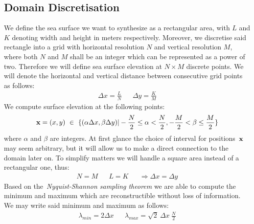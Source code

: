 \subsection{Domain Discretisation}
\label{sec:domain_discretisation}
%
We define the sea surface we want to synthesize as a rectangular area, with $L$
and $K$ denoting width and height in meters respectively. Moreover, we
discretise said rectangle into a grid with horizontal resolution $N$ and
vertical resolution $M$, where both $N$ and $M$ shall be an integer which can
be represented as a power of two. Therefore we will define sea surface elevation 
at $N\times M$ discrete points. We will denote the horizontal and vertical
distance between consecutive grid points as follows:
\begin{align*}
 \Delta x = \frac{L}{N} && \Delta y = \frac{K}{M}
\end{align*}
We compute surface elevation at the following points:
\begin{equation}
\label{eq:spatial_domain}
 \mathbf{x} = (x,y)~\in~\{(\alpha\Delta x,\beta\Delta y)|
-\frac{N}{2}\leq\alpha<\frac{N}{2},-\frac{M}{2}<\beta\leq\frac{M}{2}\}
\end{equation}
where $\alpha$ and $\beta$ are integers. At first glance the choice of interval
for positions~$\mathbf{x}$ may seem arbitrary, but it will allow us to make a
direct connection to the \wavevector domain later on.
To simplify matters we will handle a square area instead of a rectangular one,
thus:
\begin{align*}
 N = M && L = K &&\Rightarrow \Delta x = \Delta y
\end{align*}
%
Based on the~\emph{Nyquist-Shannon sampling
theorem} \citep{book:bracewell2000fourier} we are able to compute the minimum and
maximum \wavelengths which are reconstructible without loss of information.
We may write said minimum and maximum \wavelengths as follows:
\begin{align*}
 \lambda_{min} = 2\Delta x && \lambda_{max} = \sqrt{2}~\Delta x~\frac{N}{2}
\end{align*}
%
%
